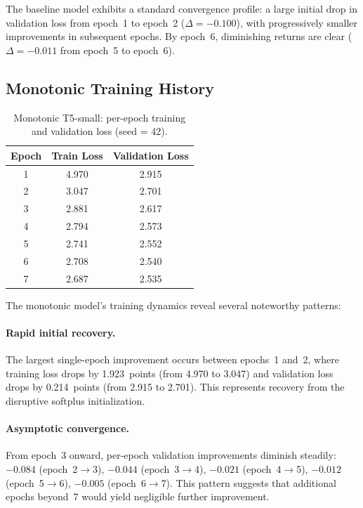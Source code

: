 \documentclass{article}
\begin{document}
The baseline model exhibits a standard convergence profile: a large initial drop in validation loss from epoch~1 to epoch~2 ($\Delta = -0.100$), with progressively smaller improvements in subsequent epochs. By epoch~6, diminishing returns are clear ($\Delta = -0.011$ from epoch~5 to epoch~6).

\subsection{Monotonic Training History}

\begin{table}[h]
\caption{Monotonic T5-small: per-epoch training and validation loss (seed = 42).}
\label{tab:monotonic-history}
\centering
\begin{tabular}{ccc}
\toprule
Epoch & Train Loss & Validation Loss \\
\midrule
1 & 4.970 & 2.915 \\
2 & 3.047 & 2.701 \\
3 & 2.881 & 2.617 \\
4 & 2.794 & 2.573 \\
5 & 2.741 & 2.552 \\
6 & 2.708 & 2.540 \\
7 & 2.687 & 2.535 \\
\bottomrule
\end{tabular}
\end{table}

The monotonic model's training dynamics reveal several noteworthy patterns:

\paragraph{Rapid initial recovery.} The largest single-epoch improvement occurs between epochs~1 and~2, where training loss drops by 1.923~points (from 4.970 to 3.047) and validation loss drops by 0.214~points (from 2.915 to 2.701). This represents recovery from the disruptive softplus initialization.

\paragraph{Asymptotic convergence.} From epoch~3 onward, per-epoch validation improvements diminish steadily: $-0.084$ (epoch~2$\to$3), $-0.044$ (epoch~3$\to$4), $-0.021$ (epoch~4$\to$5), $-0.012$ (epoch~5$\to$6), $-0.005$ (epoch~6$\to$7). This pattern suggests that additional epochs beyond~7 would yield negligible further improvement.
\end{document}
